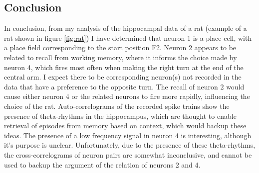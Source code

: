\documentclass[a4paper, 10pt]{article}
\begin{document}
\subsection*{Conclusion}

In conclusion, from my analysis of the hippocampal data of a rat (example of a
rat shown in figure \ref{fig:rat}) I have determined that neuron 1 is a place
cell, with a place field corresponding to the start position F2. Neuron 2
appears to be related to recall from working memory, where it informs the choice
made by neuron 4, which fires most often when making the right turn at the end
of the central arm. I expect there to be corresponding neuron(s) not recorded in
the data that have a preference to the opposite turn. The recall of neuron 2
would cause either neuron 4 or the related neurons to fire more rapidly,
influencing the choice of the rat. Auto-correlograms of the recorded spike
trains show the presence of theta-rhythms in the hippocampus, which are thought
to enable retrieval of episodes from memory based on context, which would backup
these ideas. The presence of a low frequency signal in neuron 4 is interesting,
although it's purpose is unclear. Unfortunately, due to the presence of these
theta-rhythms, the cross-correlograms of neuron pairs are somewhat inconclusive,
and cannot be used to backup the argument of the relation of neurons 2 and 4.
\end{document}
